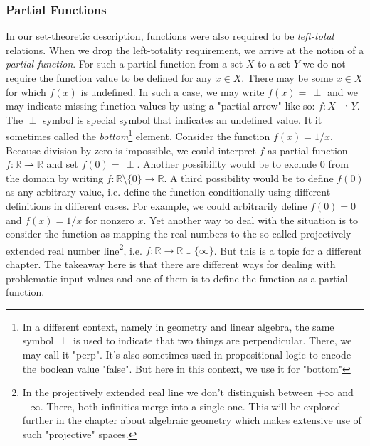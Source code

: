 \subsubsection{Partial Functions}
In our set-theoretic description, functions were also required to be \emph{left-total} relations. When we drop the left-totality requirement, we arrive at the notion of a \emph{partial function}. For such a partial function from a set $X$ to a set $Y$ we do not require the function value to be defined for any $x \in X$. There may be some $x \in X$ for which $f(x)$ is undefined. In such a case, we may write $f(x) = \, \perp$ and we may indicate missing function values by using a "partial arrow" like so: $f: X \rightharpoonup Y$. The $\perp$ symbol is special symbol that indicates an undefined value. It it sometimes called the \emph{bottom}\footnote{In a different context, namely in geometry and linear algebra, the same symbol $\perp$ is used to indicate that two things are perpendicular. There, we may call it "perp". It's also sometimes used in propositional logic to encode the boolean value "false". But here in this context, we use it for "bottom"} element. Consider the function $f(x) = 1/x$. Because division by zero is impossible, we could interpret $f$ as partial function $f: \mathbb{R} \rightharpoonup \mathbb{R}$ and set $f(0) = \, \perp$. Another possibility would be to exclude $0$ from the domain by writing $f: \mathbb{R} \setminus \{ 0 \} \rightarrow \mathbb{R}$. A third possibility would be to define $f(0)$ as any arbitrary value, i.e. define the function conditionally using different definitions in different cases. For example, we could arbitrarily define $f(0) = 0$ and $f(x) = 1/x$ for nonzero $x$. Yet another way to deal with the situation is to consider the function as mapping the real numbers to the so called projectively extended real number line\footnote{In the projectively extended real line we don't distinguish between $+\infty$ and $-\infty$. There, both infinities merge into a single one. This will be explored further in the chapter about algebraic geometry which makes extensive use of such "projective" spaces.}, i.e. $f: \mathbb{R} \rightarrow \mathbb{R} \cup \{ \infty \}$. But this is a topic for a different chapter. The takeaway here is that there are different ways for dealing with problematic input values and one of them is to define the function as a partial function.



